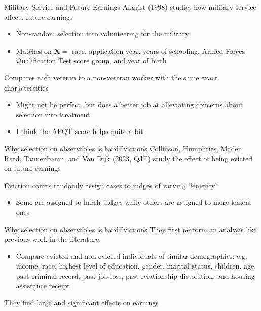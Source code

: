 \documentclass[aspectratio=169,t,11pt,table]{beamer}
\begin{document}
\begin{frame}{Military Service and Future Earnings}
  Angrist (1998) studies how military service affects future earnings
  \begin{itemize}
    \item Non-random selection into volunteering for the military
    \item Matches on $\bm{X} = $ race, application year, years of schooling, Armed Forces Qualification Test score group, and year of birth
  \end{itemize}

  \bigskip
  Compares each veteran to a non-veteran worker with the same exact charactersitics
  \pause
  \begin{itemize}
    \item Might not be perfect, but does a better job at alleviating concerns about selection into treatment
    \item I think the AFQT score helps quite a bit
  \end{itemize}
\end{frame}

\begin{frame}{Why selection on observables is hard}{Evictions}
  Collinson, Humphries, Mader, Reed, Tannenbaum, and Van Dijk (2023, QJE) study the effect of being evicted on future earnings

  \bigskip
  Eviction courts randomly assign cases to judges of varying `leniency'
  \begin{itemize}
    \item Some are assigned to harsh judges while others are assigned to more lenient ones
  \end{itemize}
\end{frame}

\begin{frame}{Why selection on observables is hard}{Evictions}
  They first perform an analysis like previous work in the literature:
  \begin{itemize}
    \item Compare evicted and non-evicted individuals of similar demographics: e.g. income, race, highest level of education, gender, marital status,
    children, age, past criminal record, past job loss, past relationship dissolution, and housing assistance receipt
  \end{itemize}
  
  \bigskip
  They find large and significant effects on earnings
\end{frame}
\end{document}
